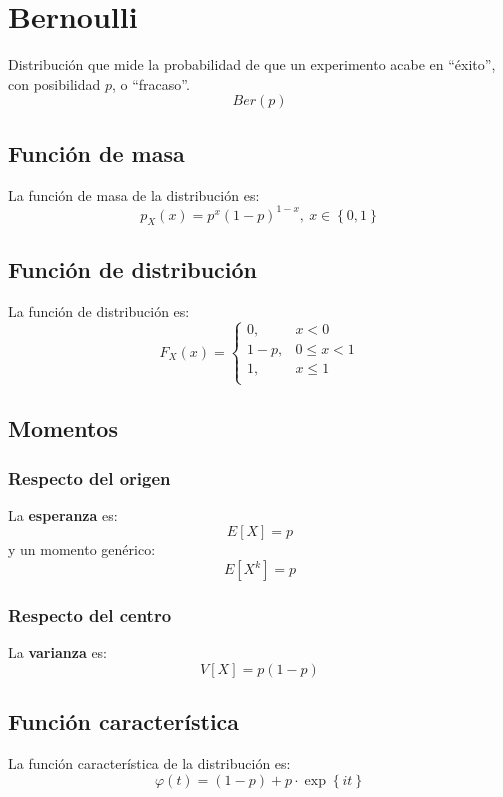 \section{Bernoulli}
\label{sec:bernoulli}
Distribución que mide la probabilidad de que un experimento acabe en ``éxito'',
con posibilidad $p$, o ``fracaso''. 
\[
\boxed{Ber\left( p \right)}
\]

\subsection{Función de masa}
La función de masa de la distribución es:
\[
p_X \left( x \right) = p^x \left( 1-p \right)^{1-x},\ x \in \left\{ 0, 1 \right\}
\]

\subsection{Función de distribución}
La función de distribución es:
\[
F_X\left( x \right) = \begin{cases}
    0, &x < 0\\ 
    1 - p, &0 \le x < 1\\
    1, &x \le 1 \\
\end{cases}
\]

\subsection{Momentos}

\subsubsection*{Respecto del origen}
La \textbf{esperanza} es: 
\[
    E\left[ X \right] = p
\]
y un momento genérico: 
\[
    E\left[ X^k \right] = p
\]
\subsubsection*{Respecto del centro}
La \textbf{varianza} es:
\[
    V\left[ X \right] = p\left( 1-p \right)
\]

\subsection{Función característica}
La función característica de la distribución es:
\[
\varphi\left( t \right) = \left( 1-p \right) + p \cdot \exp\left\{ it \right\}
\]

